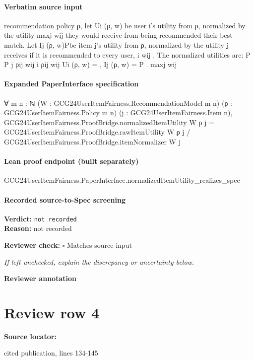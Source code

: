 \documentclass[10pt]{article}
\newcommand{\reviewerbox}{%
  \par\noindent\fbox{\parbox{0.96\linewidth}{\rule{0pt}{0.38in}}}\par
}
\newcommand{\reviewmatch}[1]{%
  \par\noindent\textbf{Reviewer check:} $\square$\; #1\par
  \noindent\emph{If left unchecked, explain the discrepancy or uncertainty below.}\par
}
\begin{document}
\paragraph{Verbatim source input}
\begin{ReviewVerbatim}
recommendation policy ρ, let Ui (ρ, w) be user i’s utility from ρ, normalized by the utility maxj wij
they would receive from being recommended their best match. Let Ij (ρ, w)Pbe item j’s utility from
ρ, normalized by the utility j receives if it is recommended to every user, i wij . The normalized
utilities are:
P
P
j ρij wij
i ρij wij
Ui (ρ, w) =
, Ij (ρ, w) = P
.
maxj wij
\end{ReviewVerbatim}


\paragraph{Expanded PaperInterface specification}
\begin{ReviewVerbatim}
∀ {m n : ℕ} (W : GCG24UserItemFairness.RecommendationModel m n) (ρ : GCG24UserItemFairness.Policy m n)
  (j : GCG24UserItemFairness.Item n),
  GCG24UserItemFairness.ProofBridge.normalizedItemUtility W ρ j =
    GCG24UserItemFairness.ProofBridge.rawItemUtility W ρ j / GCG24UserItemFairness.ProofBridge.itemNormalizer W j
\end{ReviewVerbatim}

\paragraph{Lean proof endpoint (built separately)}\begin{ReviewVerbatim}
GCG24UserItemFairness.PaperInterface.normalizedItemUtility_realizes_spec
\end{ReviewVerbatim}

\paragraph{Recorded source-to-Spec screening}
\textbf{Verdict:} \texttt{not recorded}
\\
\textbf{Reason:} not recorded
\reviewmatch{Matches source input}
\noindent\textbf{Reviewer annotation}\par
\reviewerbox
\clearpage
\hypertarget{source-claim-695e539b33a12ace}{}
\section*{Review row 4}
\textbf{Source locator:} {\footnotesize\raggedright cited publication, lines 134-\allowbreak{}145\par}
\end{document}
